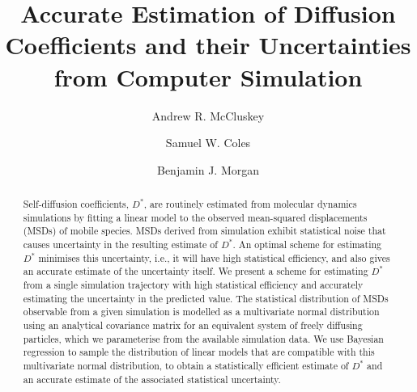 \documentclass[reprint,superscriptaddress,nobibnotes,amsmath,amssymb,aps,prx,hidelinks]{revtex4-2}
\title@column\titleblock@produce
\makeatletter
\newcommand{\papertitle}{Accurate Estimation of Diffusion Coefficients and their Uncertainties from Computer Simulation}
\newcommand{\D}{\ensuremath{D^*}}
\def\maketitle{
\@author@finish
\title@column\titleblock@produce
\suppressfloats[t]}
\makeatother
\begin{document}
\let\oldaddcontentsline\addcontentsline
\renewcommand{\addcontentsline}[3]{}

\title{\papertitle}

\author{Andrew R. McCluskey}
\author{Samuel W. Coles}
\author{Benjamin J. Morgan}

\begin{abstract}
    Self-diffusion coefficients, $\D$, are routinely estimated from molecular dynamics simulations by fitting a linear model to the observed mean-squared displacements (MSDs) of mobile species.
    MSDs derived from simulation exhibit statistical noise that causes uncertainty in the resulting estimate of $\D$.
    An optimal scheme for estimating $\D$ minimises this uncertainty, i.e., it will have high statistical efficiency, and also gives an accurate estimate of the uncertainty itself.
    We present a scheme for estimating $\D$ from a single simulation trajectory with high statistical efficiency and accurately estimating the uncertainty in the predicted value.
    The statistical distribution of MSDs observable from a given simulation is modelled as a multivariate normal distribution using an analytical covariance matrix for an equivalent system of freely diffusing particles, which we parameterise from the available simulation data. 
    We use Bayesian regression to sample the distribution of linear models that are compatible with this multivariate normal distribution, to obtain a statistically efficient estimate of $D^*$ and an accurate estimate of the associated statistical uncertainty.
\end{abstract}

\maketitle 
\end{document}
